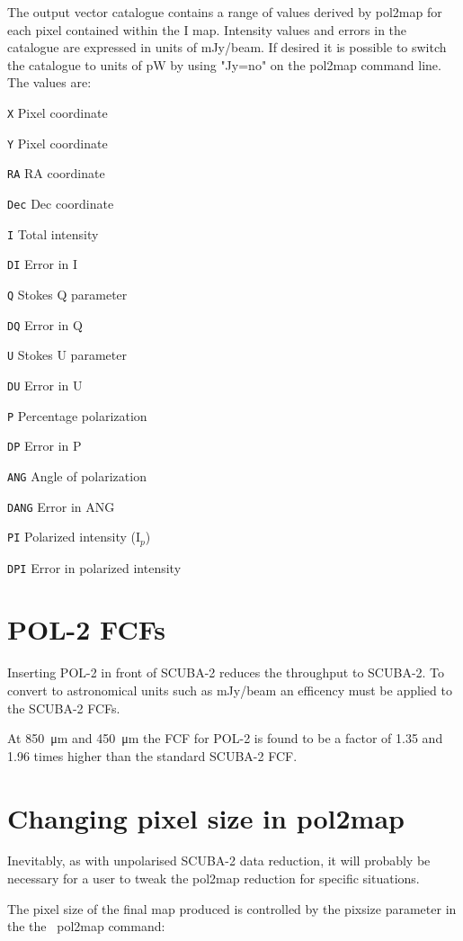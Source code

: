The output vector catalogue contains a range of values derived by
pol2map for each pixel contained within the I map. Intensity values and
errors in the
catalogue are expressed in units of mJy/beam.  If desired it is possible
to switch the catalogue to units of pW by using "Jy=no" on the pol2map
command line.  The values are:

\begin{aligndesc}
\item[\texttt{X}] Pixel coordinate
\item[\texttt{Y}] Pixel coordinate
\item[\texttt{RA}] RA coordinate
\item[\texttt{Dec}] Dec coordinate
\item[\texttt{I}] Total intensity
\item[\texttt{DI}] Error in I
\item[\texttt{Q}] Stokes Q parameter
\item[\texttt{DQ}] Error in Q
\item[\texttt{U}] Stokes U parameter
\item[\texttt{DU}] Error in U
\item[\texttt{P}] Percentage polarization
\item[\texttt{DP}] Error in P
\item[\texttt{ANG}] Angle of polarization
\item[\texttt{DANG}] Error in ANG
\item[\texttt{PI}] Polarized intensity (I$_{p}$)
\item[\texttt{DPI}] Error in polarized intensity
\end{aligndesc}


\section{POL-2 FCFs}
\label{sec:pol2map-fcf}

Inserting POL-2 in front of SCUBA-2 reduces the throughput to SCUBA-2.
To convert to astronomical units such as mJy/beam an efficency must be
applied to the SCUBA-2 FCFs.

At \SI{850}{\micro\metre} and \SI{450}{\micro\metre} the FCF for POL-2
is found to be a factor of 1.35 and 1.96 times higher than the
standard SCUBA-2 FCF.


\section{Changing pixel size in pol2map}
\label{sec:pol2map-pixelsize}

Inevitably, as with unpolarised SCUBA-2 data reduction, it will
probably be necessary for a user to tweak the pol2map reduction for
specific situations.

The pixel size of the final map produced is controlled by the pixsize
parameter in the the \smurf\ pol2map command:

\begin{terminalv}
\end{terminalv}








